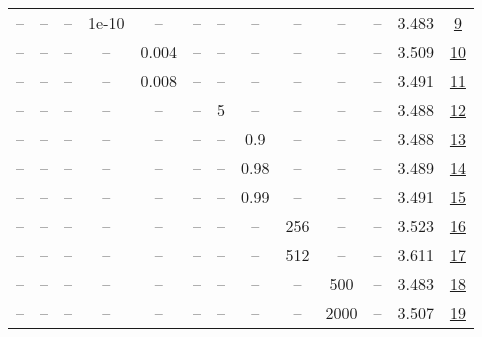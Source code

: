 \begin{table}[H]
\begin{tabular}{ccccccccccccc}
-- & -- & -- & 1e-10 & -- & -- & -- & -- & -- & -- & -- & 3.483 & \href{https://wandb.ai/stanford-mercury/optimizer-scaling/runs/sweep-130m-2B-soapl8873b6lr0.016-wd0.1-minlr0-warmup1000-b10.95--0732e5}{9} \\
-- & -- & -- & -- & 0.004 & -- & -- & -- & -- & -- & -- & 3.509 & \href{https://wandb.ai/stanford-mercury/optimizer-scaling/runs/sweep-130m-2B-soapl307a66lr0.004-wd0.1-minlr0-warmup1000-b10.95--2679d5}{10} \\
-- & -- & -- & -- & 0.008 & -- & -- & -- & -- & -- & -- & 3.491 & \href{https://wandb.ai/stanford-mercury/optimizer-scaling/runs/sweep-130m-2B-soapld74347lr0.008-wd0.1-minlr0-warmup1000-b10.95--d32f3b}{11} \\
-- & -- & -- & -- & -- & -- & 5 & -- & -- & -- & -- & 3.488 & \href{https://wandb.ai/stanford-mercury/optimizer-scaling/runs/sweep-130m-2B-soapa6f299lr0.016-wd0.1-minlr0-warmup1000-b10.95-b-7cc556}{12} \\
-- & -- & -- & -- & -- & -- & -- & 0.9 & -- & -- & -- & 3.488 & \href{https://wandb.ai/stanford-mercury/optimizer-scaling/runs/sweep-130m-2B-soapl4361f2lr0.016-wd0.1-minlr0-warmup1000-b10.95--2ad60c}{13} \\
-- & -- & -- & -- & -- & -- & -- & 0.98 & -- & -- & -- & 3.489 & \href{https://wandb.ai/stanford-mercury/optimizer-scaling/runs/sweep-130m-2B-soapl1db4cblr0.016-wd0.1-minlr0-warmup1000-b10.95--88f9b3}{14} \\
-- & -- & -- & -- & -- & -- & -- & 0.99 & -- & -- & -- & 3.491 & \href{https://wandb.ai/stanford-mercury/optimizer-scaling/runs/sweep-130m-2B-soapl2e5bdclr0.016-wd0.1-minlr0-warmup1000-b10.95--e8f7e3}{15} \\
-- & -- & -- & -- & -- & -- & -- & -- & 256 & -- & -- & 3.523 & \href{https://wandb.ai/stanford-mercury/optimizer-scaling/runs/sweep-130m-2B-soapl601977lr0.016-wd0.1-minlr0-warmup1000-b10.95--3feb67}{16} \\
-- & -- & -- & -- & -- & -- & -- & -- & 512 & -- & -- & 3.611 & \href{https://wandb.ai/stanford-mercury/optimizer-scaling/runs/sweep-130m-2B-soapl47dbfblr0.016-wd0.1-minlr0-warmup1000-b10.95--cccc39}{17} \\
-- & -- & -- & -- & -- & -- & -- & -- & -- & 500 & -- & 3.483 & \href{https://wandb.ai/stanford-mercury/optimizer-scaling/runs/sweep-130m-2B-soapl0c1650lr0.016-wd0.1-minlr0-warmup500-b10.95-b-5b4c4b}{18} \\
-- & -- & -- & -- & -- & -- & -- & -- & -- & 2000 & -- & 3.507 & \href{https://wandb.ai/stanford-mercury/optimizer-scaling/runs/sweep-130m-2B-soapla7e9f5lr0.016-wd0.1-minlr0-warmup2000-b10.95--e1c5c4}{19} \\

\end{tabular}
\end{table}
